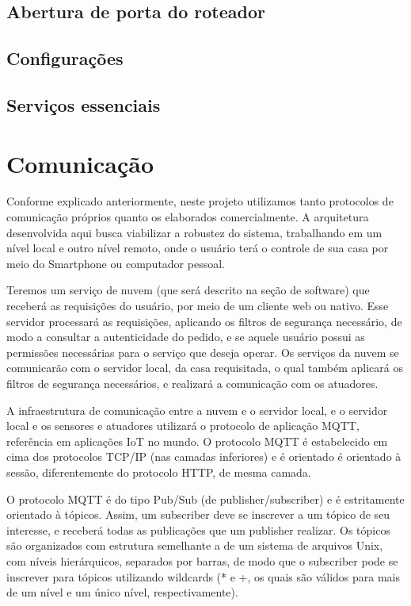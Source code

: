 \subsection{Abertura de porta do roteador}
\subsection{Configurações}
\subsection{Serviços essenciais}

\section{Comunicação}
Conforme explicado anteriormente, neste projeto utilizamos tanto protocolos de comunicação próprios quanto os elaborados comercialmente. A arquitetura desenvolvida aqui busca viabilizar a robustez do sistema, trabalhando em um nível local e outro nível remoto, onde o usuário terá o controle de sua casa por meio do Smartphone ou computador pessoal.

Teremos um serviço de nuvem (que será descrito na seção de software) que receberá as requisições do usuário, por meio de um cliente web ou nativo. Esse servidor processará as requisições, aplicando os filtros de segurança necessário, de modo a consultar a autenticidade do pedido, e se aquele usuário possui as permissões necessárias para o serviço que deseja operar. Os serviços da nuvem se comunicarão com o servidor local, da casa requisitada, o qual também aplicará os filtros de segurança necessários, e realizará a comunicação com os atuadores.

A infraestrutura de comunicação entre a nuvem e o servidor local, e o servidor local e os sensores e atuadores utilizará o protocolo de aplicação MQTT, referência em aplicações IoT no mundo. O protocolo MQTT é estabelecido em cima dos protocolos TCP/IP (nas camadas inferiores) e é orientado é orientado à sessão, diferentemente do protocolo HTTP, de mesma camada.

O protocolo MQTT é do tipo Pub/Sub (de publisher/subscriber) e é estritamente orientado à tópicos. Assim, um subscriber deve se inscrever a um tópico de seu interesse, e receberá todas as publicações que um publisher realizar. Os tópicos são organizados com estrutura semelhante a de um sistema de arquivos Unix, com níveis hierárquicos, separados por barras, de modo que o subscriber pode se inscrever para tópicos utilizando wildcards (* e +, os quais são válidos para mais de um nível e um único nível, respectivamente).

